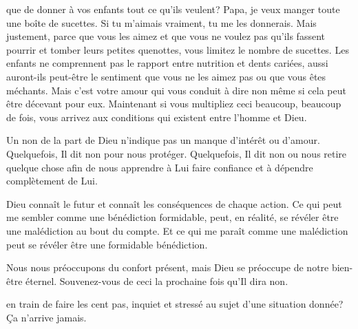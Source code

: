  que de donner à vos enfants
 tout ce qu'ils veulent?
 \og Papa, je veux manger toute une boîte de sucettes.
 Si tu m'aimais vraiment, tu me les donnerais. \fg{}
 Mais justement, parce que vous les aimez et que vous ne voulez pas
 qu'ils fassent pourrir et tomber leurs petites quenottes,
 vous limitez le nombre de sucettes.
 Les enfants ne comprennent pas le rapport entre nutrition et dents cariées,
 aussi auront-ils peut-être le sentiment que vous ne les aimez pas
 ou que vous êtes méchants. Mais c'est votre amour qui vous conduit à dire
 \og non \fg{} même si cela peut être décevant pour eux.
 Maintenant si vous multipliez ceci beaucoup, beaucoup de fois,
 vous arrivez aux conditions qui existent entre l'homme et Dieu. 


Un \og non \fg{} de la part de Dieu n'indique pas un 
 manque d'intérêt ou d'amour.
 Quelquefois, Il dit \og non \fg{} pour nous protéger.
 Quelquefois, Il dit \og non \fg{} ou nous retire quelque chose
 afin de nous apprendre à Lui faire confiance
 et à dépendre complètement de Lui. 

Dieu connaît le futur et connaît les conséquences de chaque action.
 Ce qui peut me sembler comme une bénédiction formidable, peut,
 en réalité, se révéler être une malédiction au bout du compte.
 Et ce qui me paraît comme une malédiction peut se révéler
 être une formidable bénédiction. 

Nous nous préoccupons du confort présent, mais Dieu se préoccupe
 de notre bien-être éternel.
 Souvenez-vous de ceci la prochaine fois qu'Il dira \og non. \fg{}

\dvrule






 en train de faire les cent pas,
 inquiet et stressé au sujet d'une situation donnée? Ça n'arrive jamais. 

